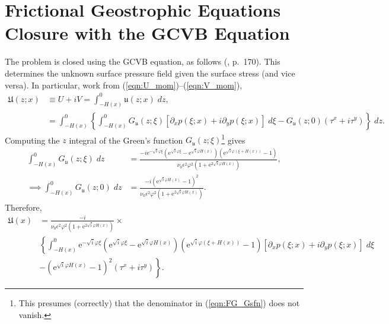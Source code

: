 \documentclass[10pt]{amsart}
\begin{document}
\section{Frictional Geostrophic Equations Closure with the GCVB Equation}

The problem is closed using the GCVB equation, as follows (\citealt{salmon98}, p.~170).
This determines the unknown surface pressure field given the surface stress (and vice versa).
In particular, work from (\ref{eqn:U_mom})--(\ref{eqn:V_mom}),
\begin{align}
\mathfrak{U} (z;x) & \equiv U + i V = \int_{-H(x)}^{0} \mathfrak{u} (z;x) \; dz , \label{eqn:depth_integrated_flow_def} \\
& = \int_{-H(x)}^0 \left\{ \int_{-H(x)}^{0} G_{ \mathfrak{u}} (z; \xi) \left[ \partial_x p( \xi; x) + i \partial_y p( \xi; x) \right] \; d \xi 
-  G_{\mathfrak{u}} (z; 0)  \left( \tau^x + i \tau^y \right)  \right\} \; dz.
\end{align}
Computing the $z$ integral of the Green's function $G_{\mathfrak{u}} (z; \xi)$\footnote{This presumes (correctly) that the denominator in (\ref{eqn:FG_Gsfn}) does not vanish.} gives 
\begin{align}
\int_{-H(x)}^0 G_{ \mathfrak{u}}(z;\xi) \; dz & = 
\frac{- i \mathrm{e}^{-\sqrt{i} \varphi \xi} 
\left(
\mathrm{e}^{\sqrt{i} \varphi \xi} - 
\mathrm{e}^{\sqrt{i} \varphi H(x)} 
\right) \left(
\mathrm{e}^{\sqrt{i} \varphi  \left( \xi + H(x) \right)} - 1
\right)
} { \nu_0 \epsilon^2 \varphi^2  \left(1 + \mathrm{e}^{2 \sqrt{i} \varphi H(x )} \right)} , \nonumber \\
\implies \int_{-H(x)}^0 G_{ \mathfrak{u}}(z;0) \; dz & = 
\frac{ - i \left( 
\mathrm{e}^{\sqrt{i} \varphi  H(x) }   - 1   
\right)^2
} { \nu_0 \epsilon^2 \varphi^2  \left(1 + \mathrm{e}^{2 \sqrt{i} \varphi H(x )} \right)} .
\end{align}
Therefore,
\begin{align}
\mathfrak{U} (x) & = 
\frac{-i }{{ \nu_0 \epsilon^2 \varphi^2  \left(1 + \mathrm{e}^{2 \sqrt{i} \varphi H(x )} \right)} } \times \nonumber \\
&\left\{
 \int_{-H(x)}^{0} 
\mathrm{e}^{-\sqrt{i} \varphi \xi} 
\left(
\mathrm{e}^{\sqrt{i} \varphi \xi} - 
\mathrm{e}^{\sqrt{i} \varphi H(x)} 
\right) \left(
\mathrm{e}^{\sqrt{i} \varphi  \left( \xi + H(x) \right)} - 1
\right)
 \left[ \partial_x p( \xi; x) + i \partial_y p( \xi; x) \right] \; d \xi  \right. \nonumber  \\
& - \left.
\left( 
\mathrm{e}^{\sqrt{i} \varphi  H(x) }   - 1   
\right)^2
\left( \tau^x + i \tau^y \right)   \right\}.
\end{align}
\end{document}
